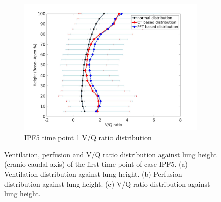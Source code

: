 \begin{figure}[htbp]
\begin{subfigure}{.6\linewidth}
  \includegraphics[width=\linewidth,trim={{.0\wd0} {.0\wd0} {.0\wd0} {.0\wd0}},clip]{Appendix/Image_AppexB/IPF511/IPF511_VQAgainstLungHeight.jpg}
  \caption{IPF5 time point 1 V/Q ratio distribution}
  \label{fig:IPF511VQDistribution-c}
\end{subfigure}
\caption{ Ventilation, perfusion and V/Q ratio distribution against lung height (cranio-caudal axis) of the first time point of case IPF5. (a) Ventilation distribution against lung height. (b) Perfusion distribution against lung height. (c) V/Q ratio distribution against lung height.}
\label{fig:IPF511VQDistribution}
\end{figure}

